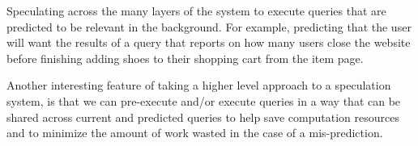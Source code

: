 Speculating across the many layers of the system to execute queries that are
predicted to be relevant in the background. For example, predicting that the
user will want the results of a query that reports on how many users close the
website before finishing adding shoes to their shopping cart from the item
page. 

Another interesting feature of taking a higher level approach to a speculation
system, is that we can pre-execute and/or execute queries in a way that can be
shared across current and predicted queries to help save computation resources
and to minimize the amount of work wasted in the case of a mis-prediction.


